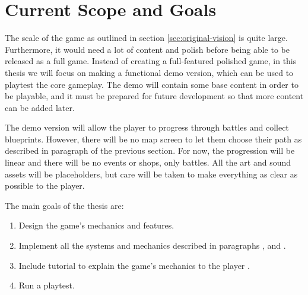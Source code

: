 \section{Current Scope and Goals}

The scale of the game as outlined in section \ref{sec:original-vision} is quite large.
Furthermore, it would need a lot of content and polish before being able to be released as a full game.
Instead of creating a full-featured polished game, in this thesis we will focus on making a functional demo version, which can be used to playtest the core gameplay.
The demo will contain some base content in order to be playable, and it must be prepared for future development so that more content can be added later.

The demo version will allow the player to progress through battles and collect blueprints.
However, there will be no map screen to let them choose their path as described in paragraph  of the previous section.
For now, the progression will be linear and there will be no events or shops, only battles.
All the art and sound assets will be placeholders, but care will be taken to make everything as clear as possible to the player.

\hfill\break
The main goals of the thesis are:
\begin{enumerate}
    \item Design the game's mechanics and features.
    \item Implement all the systems and mechanics described in paragraphs ,  and .
    \item Include tutorial to explain the game's mechanics to the player .
    \item Run a playtest.
\end{enumerate}
